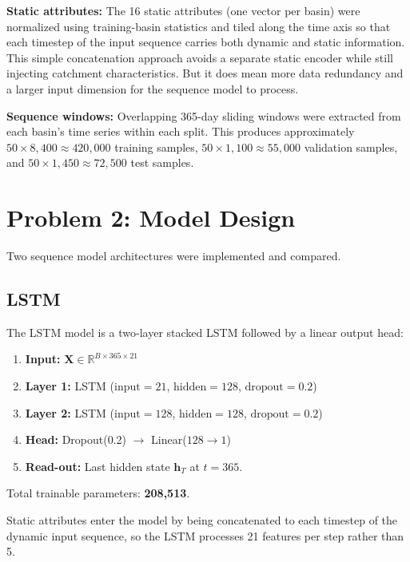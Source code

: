 \documentclass[11pt, letterpaper]{article}
\begin{document}
\textbf{Static attributes:} The 16 static attributes (one vector per basin)
were normalized using training-basin statistics and tiled along the time axis
so that each timestep of the input sequence carries both dynamic and static
information.  This simple concatenation approach avoids a separate static
encoder while still injecting catchment characteristics. But it does mean more data
redundancy and a larger input dimension for the sequence model to process.

\textbf{Sequence windows:} Overlapping 365-day sliding windows were extracted
from each basin's time series within each split.  This produces approximately
$50 \times 8{,}400 \approx 420{,}000$ training samples, $50 \times 1{,}100 \approx 55{,}000$
validation samples, and $50 \times 1{,}450 \approx 72{,}500$ test samples.

\section{Problem 2: Model Design}

Two sequence model architectures were implemented and compared.

\subsection{LSTM}

The LSTM model is a two-layer stacked LSTM followed by a linear output head:

\begin{enumerate}
    \item \textbf{Input:} $\mathbf{X} \in \mathbb{R}^{B \times 365 \times 21}$
    \item \textbf{Layer 1:} LSTM ($\text{input}=21$, $\text{hidden}=128$, $\text{dropout}=0.2$)
    \item \textbf{Layer 2:} LSTM ($\text{input}=128$, $\text{hidden}=128$, $\text{dropout}=0.2$)
    \item \textbf{Head:} Dropout(0.2) $\rightarrow$ Linear($128 \rightarrow 1$)
    \item \textbf{Read-out:} Last hidden state $\mathbf{h}_{T}$ at $t=365$.
\end{enumerate}

\noindent Total trainable parameters: \textbf{208,513}.

Static attributes enter the model by being concatenated to each timestep of the
dynamic input sequence, so the LSTM processes 21 features per step rather than 5.
\end{document}
